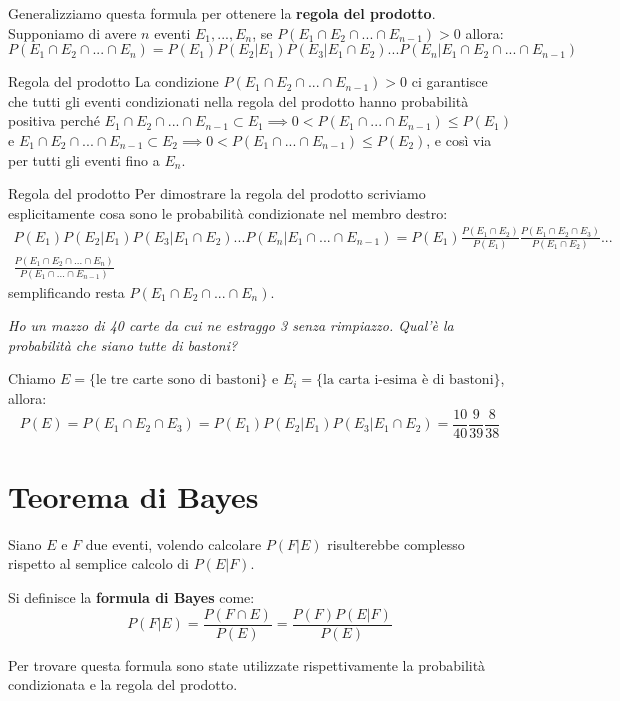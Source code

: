 \begin{redbar}
    Generalizziamo questa formula per ottenere la \textbf{regola del prodotto}. Supponiamo di avere $n$ eventi $E_1,...,E_n$, se $P(E_1\cap E_2\cap...\cap E_{n-1})>0$ allora:
    \begin{equation*}
        P(E_1\cap E_2\cap...\cap E_{n})=P(E_1)P(E_2|E_1)P(E_3|E_1\cap E_2)...P(E_n|E_1\cap E_2\cap ... \cap E_{n-1})
    \end{equation*}
\end{redbar}

\begin{Osservation}{Regola del prodotto}{}
    La condizione $P(E_1\cap E_2\cap...\cap E_{n-1})>0$ ci garantisce che tutti gli eventi condizionati nella regola del prodotto hanno probabilità positiva perché $E_1\cap E_2\cap...\cap E_{n-1}\subset E_1\implies 0<P(E_1\cap...\cap E_{n-1})\leq P(E_1)$ e $E_1\cap E_2\cap...\cap E_{n-1}\subset E_2\implies 0<P(E_1\cap...\cap E_{n-1})\leq P(E_2)$, e così via per tutti gli eventi fino a $E_n$.
\end{Osservation}

\begin{Demonstration}{Regola del prodotto}{}
    Per dimostrare la regola del prodotto scriviamo esplicitamente cosa sono le probabilità condizionate nel membro destro:
    \begin{align*}
        P(E_1)P(E_2|E_1)P(E_3|E_1\cap E_2)...P(E_n|E_1\cap...\cap E_{n-1})=P(E_1)\frac{P(E_1\cap E_2)}{P(E_1)}\frac{P(E_1\cap E_2\cap E_3)}{P(E_1\cap E_2)}...\\\frac{P(E_1\cap E_2\cap...\cap E_{n})}{P(E_1\cap...\cap E_{n-1})}
    \end{align*}
    semplificando resta $P(E_1\cap E_2\cap...\cap E_{n})$.
\end{Demonstration}

\begin{Example}{}{}
    \textit{Ho un mazzo di 40 carte da cui ne estraggo 3 senza rimpiazzo. Qual'è la probabilità che siano tutte di bastoni?}

    Chiamo  $E=\{\mbox{le tre carte sono di bastoni}\}$ e $E_i=\{\mbox{la carta i-esima è di bastoni}\}$, allora:
    \begin{equation*}
        P(E)=P(E_1\cap E_2\cap E_3)=P(E_1)P(E_2|E_1)P(E_3|E_1\cap E_2)=\frac{10}{40}\frac{9}{39}\frac{8}{38}
    \end{equation*}
\end{Example}


\section{Teorema di Bayes}
Siano $E$ e $F$ due eventi, volendo calcolare $P(F|E)$ risulterebbe complesso rispetto al semplice calcolo di $P(E|F)$. 
\begin{redbar}
    Si definisce la \textbf{formula di Bayes} come:
    \begin{equation*}
        P(F|E)=\frac{P(F\cap E)}{P(E)}=\frac{P(F)P(E|F)}{P(E)}
    \end{equation*}
\end{redbar}
Per trovare questa formula sono state utilizzate rispettivamente la probabilità condizionata e la regola del prodotto.

